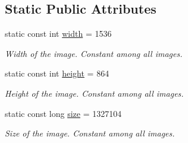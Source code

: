 \subsection*{Static Public Attributes}
\begin{DoxyCompactItemize}
\item 
static const int \hyperlink{classImage__cuda__compatible_add091d9b4be13ea87572c59541d5fe82}{width} = 1536\hypertarget{classImage__cuda__compatible_add091d9b4be13ea87572c59541d5fe82}{}\label{classImage__cuda__compatible_add091d9b4be13ea87572c59541d5fe82}

\begin{DoxyCompactList}\small\item\em Width of the image. Constant among all images. \end{DoxyCompactList}\item 
static const int \hyperlink{classImage__cuda__compatible_abf81de1dbe4a40b6388aabe60ddc5a0c}{height} = 864\hypertarget{classImage__cuda__compatible_abf81de1dbe4a40b6388aabe60ddc5a0c}{}\label{classImage__cuda__compatible_abf81de1dbe4a40b6388aabe60ddc5a0c}

\begin{DoxyCompactList}\small\item\em Height of the image. Constant among all images. \end{DoxyCompactList}\item 
static const long \hyperlink{classImage__cuda__compatible_a22cea4d1e5568cbea748f48901d99529}{size} = 1327104\hypertarget{classImage__cuda__compatible_a22cea4d1e5568cbea748f48901d99529}{}\label{classImage__cuda__compatible_a22cea4d1e5568cbea748f48901d99529}

\begin{DoxyCompactList}\small\item\em Size of the image. Constant among all images. \end{DoxyCompactList}\end{DoxyCompactItemize}
